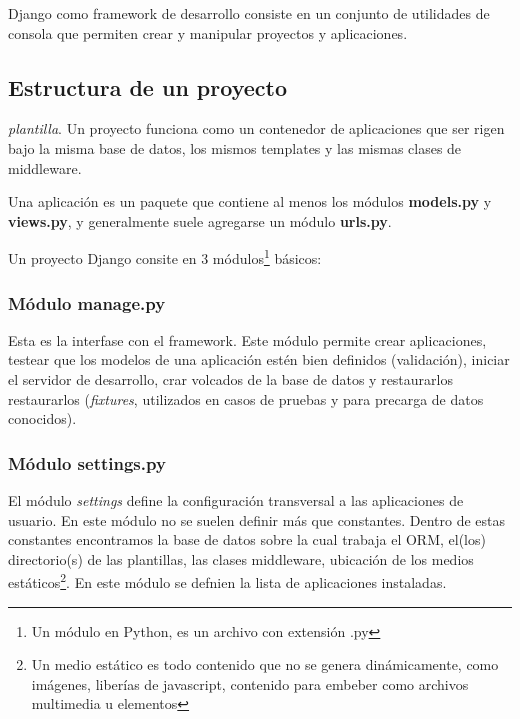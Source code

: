 \documentclass[a4paper]{report}
\begin{document}
Django como framework de desarrollo consiste en un  conjunto de utilidades 
de consola que permiten crear y manipular proyectos y aplicaciones.

\subsection*{Estructura de un proyecto}
\emph{plantilla}.
Un proyecto funciona como un contenedor de aplicaciones que ser rigen bajo
la misma base de datos, los mismos templates y las mismas clases de middleware.

Una aplicación es un paquete que contiene al menos los módulos
\textbf{models.py} y \textbf{views.py}, 
y generalmente suele agregarse un módulo \textbf{urls.py}.





Un \label{django:proyecto}{proyecto} Django consite en 3 módulos\footnote{Un
módulo en Python, es un
archivo con extensión .py} básicos:
\subsubsection*{Módulo manage.py}
  Esta es la interfase con el framework. Este módulo permite crear aplicaciones,
testear que los modelos de una aplicación estén bien definidos (validación),
iniciar el servidor de desarrollo, crar volcados de la base de datos y
restaurarlos
restaurarlos (\emph{fixtures}, utilizados en casos de pruebas y para precarga
de datos conocidos).

\subsubsection*{Módulo settings.py}
  El módulo \emph{settings} define la configuración transversal
a las aplicaciones de usuario. En este módulo no se suelen definir más que
constantes.
Dentro de estas constantes encontramos la base de datos sobre la cual trabaja el
ORM, 
el(los) directorio(s) de las plantillas, las clases middleware,
ubicación de los medios estáticos\footnote{
Un medio estático es todo contenido que no se genera dinámicamente, como
imágenes, 
liberías de javascript, contenido para embeber como archivos multimedia u
elementos}.
En este módulo se defnien la lista de aplicaciones instaladas.
\end{document}
